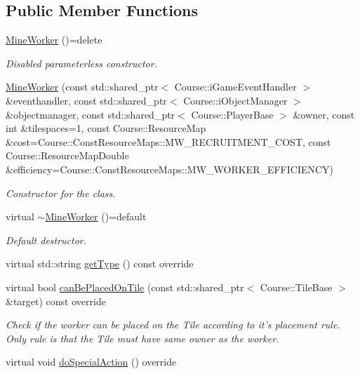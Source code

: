 \subsection*{Public Member Functions}
\begin{DoxyCompactItemize}
\item 
\hypertarget{classMineWorker_aaf862528bbda1b1acd19f9fc56ec5391}{\hyperlink{classMineWorker_aaf862528bbda1b1acd19f9fc56ec5391}{Mine\-Worker} ()=delete}\label{classMineWorker_aaf862528bbda1b1acd19f9fc56ec5391}

\begin{DoxyCompactList}\small\item\em Disabled parameterless constructor. \end{DoxyCompactList}\item 
\hyperlink{classMineWorker_a98f16e373645b0e17818865983cba18b}{Mine\-Worker} (const std\-::shared\-\_\-ptr$<$ Course\-::i\-Game\-Event\-Handler $>$ \&eventhandler, const std\-::shared\-\_\-ptr$<$ Course\-::i\-Object\-Manager $>$ \&objectmanager, const std\-::shared\-\_\-ptr$<$ Course\-::\-Player\-Base $>$ \&owner, const int \&tilespaces=1, const Course\-::\-Resource\-Map \&cost=Course\-::\-Const\-Resource\-Maps\-::\-M\-W\-\_\-\-R\-E\-C\-R\-U\-I\-T\-M\-E\-N\-T\-\_\-\-C\-O\-S\-T, const Course\-::\-Resource\-Map\-Double \&efficiency=Course\-::\-Const\-Resource\-Maps\-::\-M\-W\-\_\-\-W\-O\-R\-K\-E\-R\-\_\-\-E\-F\-F\-I\-C\-I\-E\-N\-C\-Y)
\begin{DoxyCompactList}\small\item\em Constructor for the class. \end{DoxyCompactList}\item 
\hypertarget{classMineWorker_a86c512f4ba29198dc819eb2dc2def097}{virtual \hyperlink{classMineWorker_a86c512f4ba29198dc819eb2dc2def097}{$\sim$\-Mine\-Worker} ()=default}\label{classMineWorker_a86c512f4ba29198dc819eb2dc2def097}

\begin{DoxyCompactList}\small\item\em Default destructor. \end{DoxyCompactList}\item 
virtual std\-::string \hyperlink{classMineWorker_a0bf862a2e75fe61bfb5b3c1b2cd7d362}{get\-Type} () const override
\item 
virtual bool \hyperlink{classMineWorker_a70c0a63fe8de3d5177c8a5425cea6596}{can\-Be\-Placed\-On\-Tile} (const std\-::shared\-\_\-ptr$<$ Course\-::\-Tile\-Base $>$ \&target) const override
\begin{DoxyCompactList}\small\item\em Check if the worker can be placed on the Tile according to it's placement rule. Only rule is that the Tile must have same owner as the worker. \end{DoxyCompactList}\item 
\hypertarget{classMineWorker_add98cd0ed5af0512f911f4eb55d75f04}{virtual void \hyperlink{classMineWorker_add98cd0ed5af0512f911f4eb55d75f04}{do\-Special\-Action} () override}\label{classMineWorker_add98cd0ed5af0512f911f4eb55d75f04}


\end{DoxyCompactItemize}
